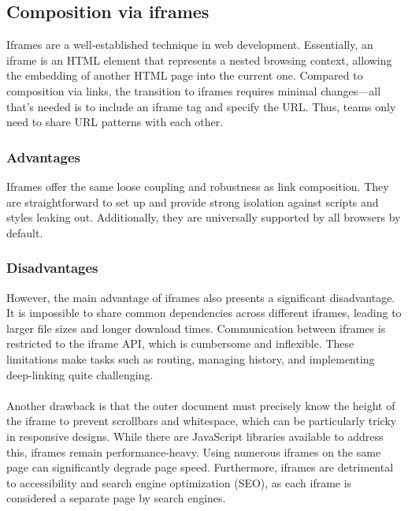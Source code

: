 \subsection{Composition via iframes}
Iframes are a well-established technique in web development. Essentially, an iframe is an HTML element that represents a nested browsing context, allowing the embedding of another HTML page into the current one. Compared to composition via links, the transition to iframes requires minimal changes—all that's needed is to include an iframe tag and specify the URL. Thus, teams only need to share URL patterns with each other. \cite{IframeDocs} 

\subsubsection{Advantages}
Iframes offer the same loose coupling and robustness as link composition. They are straightforward to set up and provide strong isolation against scripts and styles leaking out. Additionally, they are universally supported by all browsers by default. \cite{MFApplication}\cite{MFInAction}\cite{MFFowler}

\subsubsection{Disadvantages}
However, the main advantage of iframes also presents a significant disadvantage. It is impossible to share common dependencies across different iframes, leading to larger file sizes and longer download times. Communication between iframes is restricted to the iframe API, which is cumbersome and inflexible. These limitations make tasks such as routing, managing history, and implementing deep-linking quite challenging. \\\\
Another drawback is that the outer document must precisely know the height of the iframe to prevent scrollbars and whitespace, which can be particularly tricky in responsive designs. While there are JavaScript libraries available to address this, iframes remain performance-heavy. Using numerous iframes on the same page can significantly degrade page speed. Furthermore, iframes are detrimental to accessibility and search engine optimization (SEO), as each iframe is considered a separate page by search engines. \cite{MFInAction}\cite{MFApplication}\cite{MFFowler}

